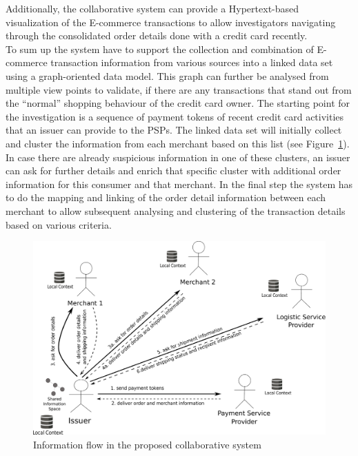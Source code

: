 Additionally, the collaborative system can provide a Hypertext-based visualization of the \gls{E-commerce} transactions to allow investigators navigating through the consolidated order details done with a credit card recently. \\

To sum up the system have to support the collection and combination of \gls{E-commerce} transaction information from various sources into a linked data set using a graph-oriented data model. This graph can further be analysed from multiple view points to validate, if there are any transactions that stand out from the ``normal'' shopping behaviour of the credit card owner. The starting point for the investigation is a sequence of payment tokens of recent credit card activities that an issuer can provide to the \gls{PSP}s. The linked data set will initially collect and cluster the information from each merchant based on this list (see Figure~\ref{fig:system_workflow}). In case there are already suspicious information in one of these clusters, an issuer can ask for further details and enrich that specific cluster with additional order information for this consumer and that merchant. In the final step the system has to do the mapping and linking of the order detail information between each merchant to allow subsequent analysing and clustering of the transaction details based on various criteria.

\begin{figure}[H]
  \centering
  \includegraphics[width=0.7\columnwidth]{images/system_P2P_decentralized.pdf}
  \caption{Information flow in the proposed collaborative system}
\label{fig:system_workflow}
\end{figure}


